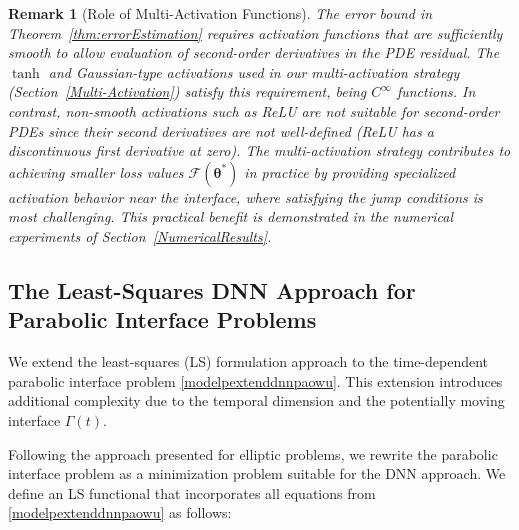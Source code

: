 \documentclass{article}
\newtheorem{remark}{Remark}[section]
\begin{document}
\begin{remark}[Role of Multi-Activation Functions]
The error bound in Theorem~\ref{thm:errorEstimation} requires activation functions that are sufficiently smooth to allow evaluation of second-order derivatives in the PDE residual. The $\tanh$ and Gaussian-type activations used in our multi-activation strategy (Section~\ref{Multi-Activation}) satisfy this requirement, being $C^\infty$ functions. In contrast, non-smooth activations such as ReLU are not suitable for second-order PDEs since their second derivatives are not well-defined (ReLU has a discontinuous first derivative at zero). The multi-activation strategy contributes to achieving smaller loss values $\mathcal{F}(\boldsymbol{\theta}^*)$ in practice by providing specialized activation behavior near the interface, where satisfying the jump conditions is most challenging. This practical benefit is demonstrated in the numerical experiments of Section~\ref{NumericalResults}.
\end{remark}



\subsection{The Least-Squares DNN Approach for Parabolic Interface Problems}\label{Least-SquaresP}

We extend the least-squares (LS) formulation approach to the time-dependent parabolic interface problem \eqref{modelpextenddnnpaowu}. This extension introduces additional complexity due to the temporal dimension and the potentially moving interface $\Gamma(t)$.

Following the approach presented for elliptic problems, we rewrite the parabolic interface problem as a minimization problem suitable for the DNN approach. We define an LS functional that incorporates all equations from \eqref{modelpextenddnnpaowu} as follows:
\end{document}
